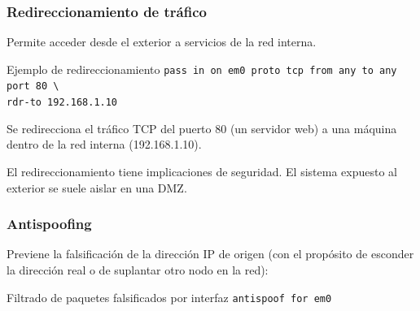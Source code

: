 \documentclass{beamer}
\begin{document}

\begin{frame}
\frametitle{Redireccionamiento de tráfico}

Permite acceder desde el exterior a servicios de la red interna.

\begin{block}{Ejemplo de redireccionamiento}
\tt pass in on em0 proto tcp from any to any port 80 \textbackslash \\
\hspace{7mm} rdr-to 192.168.1.10
\end{block}
\footnotesize
Se redirecciona el tráfico TCP del puerto 80 (un servidor web) a una máquina dentro de la red interna (192.168.1.10). 

\bigskip
\normalsize
\begin{center}
El redireccionamiento tiene \alert{implicaciones de seguridad}. El sistema expuesto al exterior se suele aislar en una \alert{DMZ}.
\end{center}

\end{frame}



\begin{frame}
\frametitle{Antispoofing}

Previene la \alert{falsificación} de la dirección IP de origen (con el propósito de esconder la dirección real o de suplantar otro nodo en la red):

\begin{block}{Filtrado de paquetes falsificados por interfaz}
\tt antispoof for em0
\end{block}

\end{frame}

\end{document}
